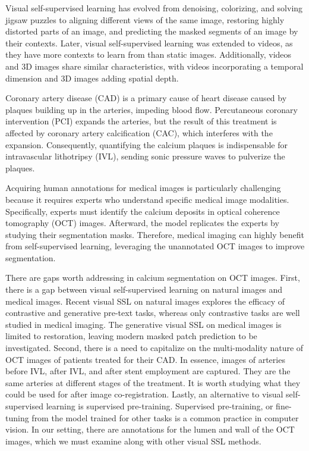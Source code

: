 \documentclass[a4paper,11pt,oneside]{report}
\begin{document}
Visual self-supervised learning has evolved from denoising, colorizing, and solving jigsaw puzzles to aligning different views of the same image, restoring highly distorted parts of an image, and predicting the masked segments of an image by their contexts. Later, visual self-supervised learning was extended to videos, as they have more contexts to learn from than static images. Additionally, videos and 3D images share similar characteristics, with videos incorporating a temporal dimension and 3D images adding spatial depth.

Coronary artery disease (CAD) is a primary cause of heart disease caused by plaques building up in the arteries, impeding blood flow. Percutaneous coronary intervention (PCI) expands the arteries, but the result of this treatment is affected by coronary artery calcification (CAC), which interferes with the expansion. Consequently, quantifying the calcium plaques is indispensable for intravascular lithotripsy (IVL), sending sonic pressure waves to pulverize the plaques.

Acquiring human annotations for medical images is particularly challenging because it requires experts who understand specific medical image modalities. Specifically, experts must identify the calcium deposits in optical coherence tomography (OCT) images. Afterward, the model replicates the experts by studying their segmentation masks. Therefore, medical imaging can highly benefit from self-supervised learning, leveraging the unannotated OCT images to improve segmentation.

There are gaps worth addressing in calcium segmentation on OCT images. First, there is a gap between visual self-supervised learning on natural images and medical images. Recent visual SSL on natural images explores the efficacy of contrastive and generative pre-text tasks, whereas only contrastive tasks are well studied in medical imaging. The generative visual SSL on medical images is limited to restoration, leaving modern masked patch prediction to be investigated. Second, there is a need to capitalize on the multi-modality nature of OCT images of patients treated for their CAD. In essence, images of arteries before IVL, after IVL, and after stent employment are captured. They are the same arteries at different stages of the treatment. It is worth studying what they could be used for after image co-registration. Lastly, an alternative to visual self-supervised learning is supervised pre-training. Supervised pre-training, or fine-tuning from the model trained for other tasks is a common practice in computer vision. In our setting, there are annotations for the lumen and wall of the OCT images, which we must examine along with other visual SSL methods.
\end{document}
